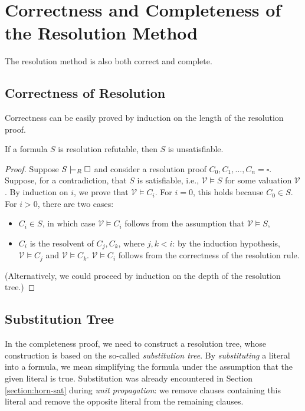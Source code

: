\section{Correctness and Completeness of the Resolution Method}

The resolution method is also both correct and complete. 

\subsection{Correctness of Resolution}

Correctness can be easily proved by induction on the length of the resolution proof.

\begin{theorem}\label{theorem:soundness-resolution}
If a formula $S$ is resolution refutable, then $S$ is unsatisfiable.
\end{theorem}
\begin{proof}
    Suppose $S \proves_R \square$ and consider a resolution proof $C_0, C_1, \dots, C_n = \square$. Suppose, for a contradiction, that $S$ is satisfiable, i.e., $\mathcal{V} \models S$ for some valuation $\mathcal{V}$. By induction on $i$, we prove that $\mathcal{V} \models C_i$. For $i = 0$, this holds because $C_0 \in S$. For $i > 0$, there are two cases:
    \begin{itemize}
        \item $C_i \in S$, in which case $\mathcal{V} \models C_i$ follows from the assumption that $\mathcal{V} \models S$,
        \item $C_i$ is the resolvent of $C_j, C_k$, where $j, k < i$: by the induction hypothesis, $\mathcal{V} \models C_j$ and $\mathcal{V} \models C_k$. $\mathcal{V} \models C_i$ follows from the correctness of the resolution rule.
    \end{itemize}
    (Alternatively, we could proceed by induction on the depth of the resolution tree.)
\end{proof}

\subsection{Substitution Tree}

In the completeness proof, we need to construct a resolution tree, whose construction is based on the so-called \emph{substitution tree}. By \emph{substituting} a literal into a formula, we mean simplifying the formula under the assumption that the given literal is true. Substitution was already encountered in Section \ref{section:horn-sat} during \emph{unit propagation}: we remove clauses containing this literal and remove the opposite literal from the remaining clauses.

